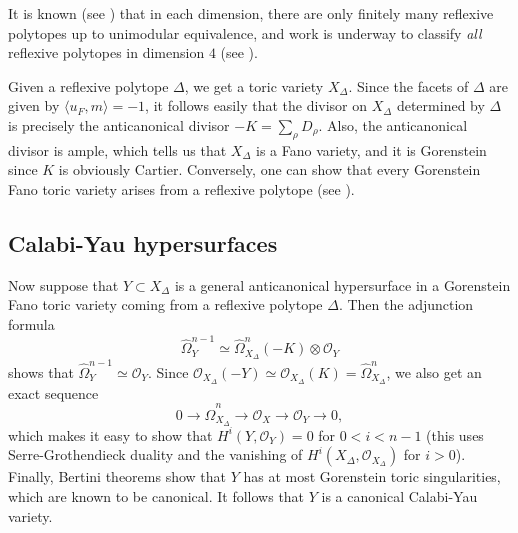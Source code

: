\documentclass{amsart}
\theoremstyle{plain}
\theoremstyle{definition}
\begin{document}
	It is known (see \cite{Bat1}) that in each dimension, there
are only finitely many reflexive polytopes up to unimodular
equivalence, and work is underway to classify {\it all\/} reflexive
polytopes in dimension $4$ (see \cite{Ska}).  

	Given a reflexive polytope $\Delta$, we get a toric variety
$X_\Delta$.  Since the facets of $\Delta$ are given by $\langle
u_F,m\rangle = -1$, it follows easily that the divisor on $X_\Delta$
determined by $\Delta$ is precisely the anticanonical divisor $-K =
\sum_\rho D_\rho$.  Also, the anticanonical divisor is ample, which
tells us that $X_\Delta$ is a Fano variety, and it is Gorenstein
since $K$ is obviously Cartier.  Conversely, one can show that every
Gorenstein Fano toric variety arises from a reflexive polytope (see
\cite{Bat1}).

	\subsection{Calabi-Yau hypersurfaces} Now suppose that
$Y \subset X_\Delta$ is a general anticanonical hypersurface in a
Gorenstein Fano toric variety coming from a reflexive polytope
$\Delta$.  Then the adjunction formula
\[
\widehat\Omega_Y^{n-1} \simeq
\widehat\Omega_{X_\Delta}^n(-K)\otimes\mathcal{O}_Y 
\]
shows that $\widehat\Omega^{n-1}_Y \simeq \mathcal{O}_Y$.  Since
$\mathcal{O}_{X_\Delta}(-Y) \simeq \mathcal{O}_{X_\Delta}(K) = 
\widehat\Omega_{X_\Delta}^n$, we also get an exact sequence
\[
0 \longrightarrow \widehat\Omega_{X_\Delta}^n \longrightarrow
\mathcal{O}_X \longrightarrow \mathcal{O}_Y \longrightarrow 0,
\]
which makes it easy to show that $H^i(Y,\mathcal{O}_Y) = 0$ for $0 < i <
n-1$ (this uses Serre-Grothendieck duality and the vanishing of
$H^i(X_\Delta,\mathcal{O}_{X_\Delta})$ for $i > 0$).  Finally, Bertini
theorems show that $Y$ has at most Gorenstein toric singularities,
which are known to be canonical.  It follows that $Y$ is a canonical
Calabi-Yau variety.
\end{document}
